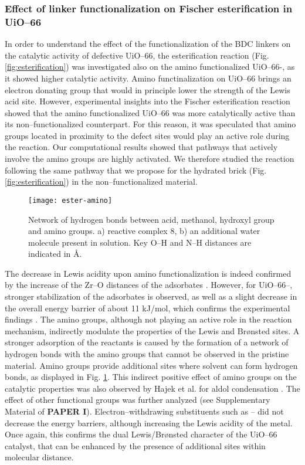 \subsubsection*{Effect of linker functionalization on Fischer esterification in UiO--66}
In order to understand the effect of the functionalization of the BDC linkers on the catalytic activity of defective UiO--66, the esterification reaction (Fig. \ref{fig:esterification}) was investigated also on the amino functionalized UiO--66-, as it showed higher catalytic activity. Amino functinalization on UiO--66 brings an electron donating group that would in principle lower the strength of the Lewis acid site. However, experimental insights into the Fischer esterification reaction showed that the amino functionalized UiO--66 was more catalytically active than its non--functionalized counterpart. For this reason, it was speculated that amino groups located in proximity to the defect sites would play an active role during the reaction. Our computational results showed that pathways that actively involve the amino groups are highly activated. We therefore studied the reaction following the same pathway that we propose for the hydrated brick (Fig. \ref{fig:esterification}) in the non--functionalized material.
\npar
\begin{figure}[!htbp]
	\centering
	\texttt{[image: ester-amino]}
	\caption{Network of hydrogen bonds between acid, methanol, hydroxyl group and amino groups. a) reactive complex 8, b) an additional water molecule present in solution. Key O--H and N--H distances are indicated in \AA.}
	\label{fig:ester-amino}
\end{figure}
The decrease in Lewis acidity upon amino functionalization is indeed confirmed by the increase of the Zr--O distances of the adsorbates \cite{vermoortele2012electronic}. However, for UiO--66--, stronger stabilization of the adsorbates is observed, as well as a slight decrease in the overall energy barrier of about 11 kJ/mol, which confirms the experimental findings \cite{cirujano2015conversion, cirujano2015zirconium}. The amino groups, although not playing an active role in the reaction mechanism, indirectly modulate the properties of the Lewis and Br\o{}nsted sites. A stronger adsorption of the reactants is caused by the formation of a network of hydrogen bonds with the amino groups that cannot be observed in the pristine material. Amino groups provide additional sites where solvent can form hydrogen bonds, as displayed in Fig. \ref{fig:ester-amino}. This indirect positive effect of amino groups on the catalytic properties was also observed by Hajek et al. for aldol condensation \cite{vandichel2015active}. The effect of other functional groups was further analyzed (see Supplementary Material of \textbf{PAPER I}). Electron--withdrawing substituents such as -- did not decrease the energy barriers, although increasing the Lewis acidity of the metal. Once again, this confirms the dual Lewis/Br\o{}nsted character of the UiO--66 catalyst, that can be enhanced by the presence of additional sites within molecular distance. 


